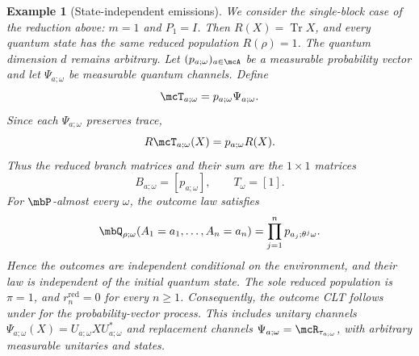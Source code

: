 \documentclass[a4paper]{article}
\numberwithin{equation}{section}   %
\theoremstyle{plain}   %
\theoremstyle{plain}   %
\theoremstyle{examplestyle}
\newtheorem{example}{Example}
\DeclareMathOperator{\pr}{\mbP}           %
\begin{document}
    \begin{example}[State-independent emissions]
    \label{eg:state-independent-emissions}
        We consider the single-block case of the reduction above: $m=1$ and $P_1=I$.
        Then $R(X)=\operatorname{Tr}X$, and every quantum state has the same reduced population $R(\rho)=1$.
        The quantum dimension $d$ remains arbitrary.
        Let $(p_{a;\omega})_{a\in\mcA}$ be a measurable probability vector and let $\Psi_{a;\omega}$ be measurable quantum channels.
        Define
        \[
            \mcT_{a;\omega}
            =p_{a;\omega}\Psi_{a;\omega}.
        \]
        Since each $\Psi_{a;\omega}$ preserves trace,
        \[
             R\mcT_{a;\omega}(X)
             =p_{a;\omega}R(X).
        \]
        Thus the reduced branch matrices and their sum are the $1\times1$ matrices
        \[
             B_{a;\omega}=[p_{a;\omega}],
             \qquad
             T_\omega=[1].
        \]
        For $\pr$-almost every $\omega$, the outcome law satisfies
        \[
             \mbQ_{\rho;\omega}(A_1=a_1,\ldots,A_n=a_n)
             =\prod_{j=1}^n p_{a_j;\theta^j\omega}.
        \]
        Hence the outcomes are independent conditional on the environment, and their law is independent of the initial quantum state. 
        The sole reduced population is $\pi=1$, and $r_n^{\mathrm{red}}=0$ for every $n\ge1$.
        Consequently, the outcome CLT follows under  for the probability-vector process.
        This includes unitary channels $\Psi_{a;\omega}(X)=U_{a;\omega}XU_{a;\omega}^*$ and replacement channels $\Psi_{a;\omega}=\mcR_{\tau_{a;\omega}}$, with arbitrary measurable unitaries and states.
    \end{example}
\end{document}
